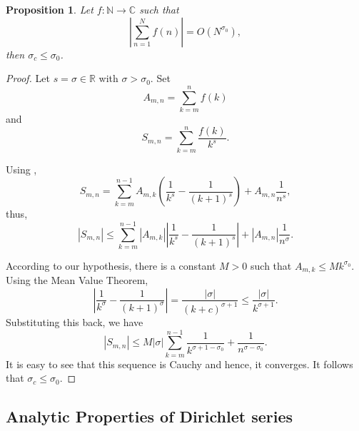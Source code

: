 \documentclass[12pt]{article}
\theoremstyle{thmstyle}
\newtheorem{proposition}[theorem]{Proposition}
\theoremstyle{defstyle}
\newcommand{\R}{\mathbb{R}}
\newcommand{\N}{\mathbb{N}}
\newcommand{\bbC}{\mathbb{C}}
\renewcommand{\le}{\leqslant}
\begin{document}
\begin{proposition}
    Let $f:\N\to\bbC$ such that 
    \begin{equation*}
        \left|\sum_{n = 1}^N f(n)\right| = O(N^{\sigma_0}),
    \end{equation*}
    then $\sigma_c\le\sigma_0$.
\end{proposition}
\begin{proof}
    Let $s = \sigma\in\R$ with $\sigma > \sigma_0$. Set 
    \begin{equation*}
        A_{m,n} = \sum_{k = m}^n f(k)
    \end{equation*}
    and 
    \begin{equation*}
        S_{m,n} = \sum_{k = m}^{n}\frac{f(k)}{k^s}.
    \end{equation*}

    Using , 
    \begin{equation*}
        S_{m,n} = \sum_{k = m}^{n - 1}A_{m,k}\left(\frac{1}{k^s} - \frac{1}{(k + 1)^s}\right) + A_{m,n}\frac{1}{n^s},
    \end{equation*}
    thus, 
    \begin{equation*}
        |S_{m,n}|\le\sum_{k = m}^{n - 1}|A_{m,k}|\left|\frac{1}{k^s} - \frac{1}{(k + 1)^s}\right| + |A_{m,n}|\frac{1}{n^\sigma}.
    \end{equation*}

    According to our hypothesis, there is a constant $M > 0$ such that $A_{m,k}\le Mk^{\sigma_0}$. Using the Mean Value Theorem, 
    \begin{equation*}
        \left|\frac{1}{k^\sigma} - \frac{1}{(k + 1)^\sigma}\right| = \frac{|\sigma|}{(k + c)^{\sigma + 1}}\le\frac{|\sigma|}{k^{\sigma + 1}}.
    \end{equation*}
    Substituting this back, we have 
    \begin{equation*}
        |S_{m,n}|\le M|\sigma|\sum_{k = m}^{n - 1}\frac{1}{k^{\sigma + 1 - \sigma_0}} + \frac{1}{n^{\sigma - \sigma_0}}.
    \end{equation*}
    It is easy to see that this sequence is Cauchy and hence, it converges. It follows that $\sigma_c\le\sigma_0$.
\end{proof}

\subsection{Analytic Properties of Dirichlet series}
\end{document}
